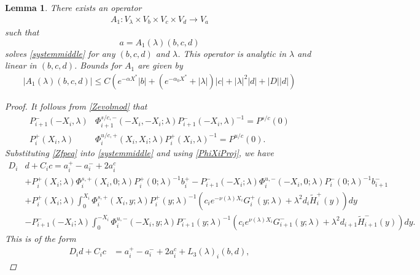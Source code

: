 \documentclass[10pt,reqno]{amsart}
\theoremstyle{plain}
\newtheorem{lemma}[theorem]{Lemma}
\theoremstyle{definition}
\theoremstyle{remark}
\numberwithin{theorem}{section}
\numberwithin{equation}{section}
\begin{document}
\begin{lemma}\label{Zinv1}
There exists an operator
\begin{align*}
A_1: V_\lambda \times V_b \times V_c \times V_d \rightarrow V_a
\end{align*}
such that 
\[
a = A_1(\lambda)(b, c, d)
\]
solves \eqref{systemmiddle} for any $(b, c, d)$ and $\lambda$. This operator is analytic in $\lambda$ and linear in $(b, c, d)$. Bounds for $A_1$ are given by
\begin{align}\label{A1bound}
|A_1(\lambda)(b, c, d)| \leq C \left( e^{-\alpha X^*} |b| + (e^{-\alpha_0 X^*} + |\lambda|)|c| + |\lambda|^2 |d| + |D||d| \right)
\end{align} 

\begin{proof}
It follows from \cref{Zevolmod} that
\begin{equation}\label{PhiXiProj}
\begin{aligned}
P_{i+1}^-(-X_i, \lambda) &\Phi_{i+1}^{s/c,-}(-X_i, -X_i; \lambda) P_{i+1}^-(-X_i, \lambda)^{-1} = P^{s/c}(0) \\
P_i^+(X_i, \lambda) &\Phi^{u/c,+}_{i}(X_i, X_i; \lambda) P_i^+(X_i, \lambda)^{-1} = P^{u/c}(0).
\end{aligned}
\end{equation}
Substituting \cref{Zfpeq} into \cref{systemmiddle} and using \cref{PhiXiProj}, we have
\begin{equation}\label{Didexpansion}
\begin{aligned}
D_i &d + C_i c = a_i^+ - a_i^- + 2 a_i^c \\
&+ P_i^+(X_i; \lambda)\Phi_i^{s,+}(X_i, 0; \lambda) P_i^+(0; \lambda)^{-1} b_i^+ - P_{i+1}^-(-X_i; \lambda)\Phi_i^{u,-}(-X_i, 0; \lambda) P_i^-(0; \lambda)^{-1} b_{i+1}^- \\
&+ P_i^+(X_i; \lambda) \int_0^{X_i} \Phi_i^{s,+}(X_i, y; \lambda)P_i^+(y; \lambda)^{-1} (c_i e^{-\nu(\lambda)X_i} G_i^+(y; \lambda) + \lambda^2 d_i \tilde{H}_i^+(y)) dy \\ 
&- P_{i+1}^-(-X_i; \lambda) \int_0^{-X_i} \Phi_i^{u,-}(-X_i, y; \lambda) P_{i+1}^-(y; \lambda)^{-1}(c_i e^{\nu(\lambda)X_i} G_{i+1}^-(y; \lambda) + \lambda^2 d_{i+1} \tilde{H}_{i+1}^-(y)) dy.
\end{aligned}
\end{equation}
This is of the form
\begin{align}\label{Dideq1}
D_i d + C_i c &= a_i^+ - a_i^- + 2 a_i^c + L_3(\lambda)_i(b, d),
\end{align}

\end{proof}
\end{lemma}
\end{document}
